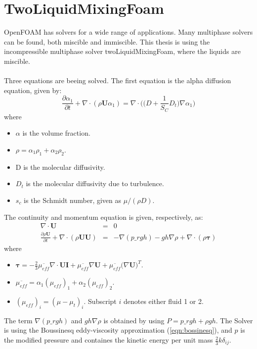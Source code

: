 \documentclass[a4paper, 12pt]{report}
\begin{document}
\section{TwoLiquidMixingFoam}
OpenFOAM has solvers for a wide range of applications. Many multiphase solvers can be found, both miscible and immiscible. This thesis is using the incompressible multiphase solver twoLiquidMixingFoam, where the liquids are miscible.\\
\\
Three equations are beeing solved. The first equation is the alpha diffusion equation, given by:
\begin{equation}
\frac{\partial \alpha_1}{\partial t} + \nabla \cdot (\rho \mathbf{U} \alpha_1) = \nabla \cdot \Big(\big(D + \frac{1}{S_C} D_t \big)\nabla \alpha_1 \Big) 
\label{eqn:alphaEqTLMF}
\end{equation}
where
\begin{itemize}
	\item $\alpha$ is the volume fraction.	
	\item $\rho = \alpha_1 \rho_1 + \alpha_2 \rho_2$.
	\item D is the molecular diffusivity.
	\item $D_t$ is the molecular diffusivity due to turbulence.
	\item $s_c$ is the Schmidt number, given as $\mu / (\rho D)$.
\end{itemize}
The continuity and momentum equation is given, respectively, as: 
\begin{eqnarray}
\label{eqn:continuityTLMF}
\nabla \cdot \mathbf{U} &=& 0 \\
\label{eqn:momentumTLMF}
\frac{\partial \rho \mathbf{U}}{\partial t} + \nabla \cdot(\rho \mathbf{U} \mathbf{U}) &=& - \nabla (p\_rgh) - gh\nabla \rho + \nabla \cdot (\rho \boldsymbol{\tau})
\end{eqnarray}
where 
\begin{itemize}
	\item $\boldsymbol{\tau} = -\frac{2}{3}\overline{\mu_{eff}}\nabla \cdot \mathbf{U} \mathbf{I} + \overline{\mu_{eff}}\nabla \mathbf{U} + \overline{\mu_{eff}}\big(\nabla \mathbf{U}\big)^T$.
	\item $\overline{\mu_{eff}} = \alpha_1 (\mu_{eff})_1 + \alpha_2 (\mu_{eff})_2$.
	\item $(\mu_{eff})_i = (\mu - \mu_t)_i$. Subscript $i$ denotes either fluid 1 or 2.
\end{itemize}
The term $\nabla(p\_rgh)$ and $gh \nabla \rho$ is obtained by using $P = p\_rgh + \rho gh$. The Solver is using the Boussinesq eddy-viscosity approximation (\ref{eqn:bossinesq}), and $p$ is the modified pressure and containes the kinetic energy per unit mass $\frac{2}{3}k\delta_{ij}$. 
\end{document}
